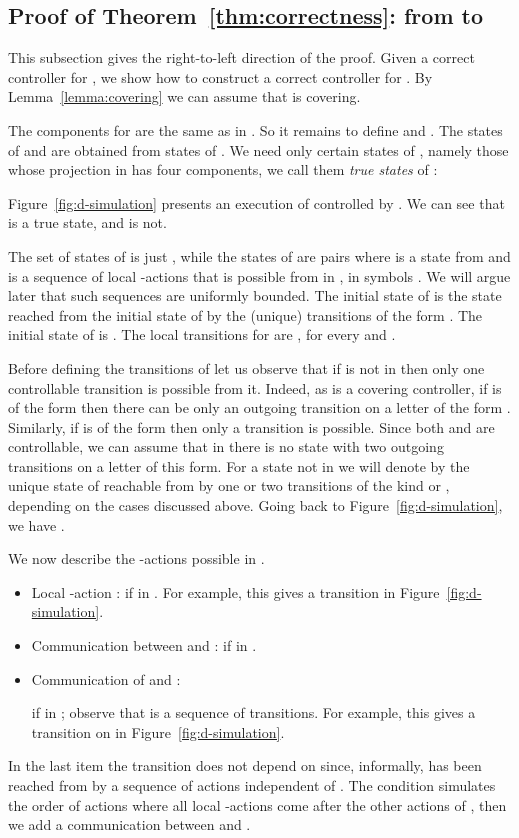 \documentclass[10pt,a4paper]{article}
\begin{document}
\subsection{Proof of Theorem~\ref{thm:correctness}: from 
                                to }\label{sec:D}
This subsection gives the
right-to-left direction of the proof. Given a correct controller  for
, we show how to construct a correct controller  for
. By Lemma~\ref{lemma:covering} we can assume that  is
covering.



The components  for  are the same as in
. So it remains to define
 and . 
The states of  and  are obtained from states of
. We need only certain states of ,
namely those  whose projection  in  has four
components, we call them \emph{true states} of :

Figure~\ref{fig:d-simulation}
presents an execution of  controlled by . We can see
that  is a true state, and  is not.

The set of states of  is just , while the states of
 are pairs  where  is a state from
 and  is a sequence of local
-actions  that is possible from  in , in
symbols . We will argue later that such sequences are
uniformly bounded. The
initial state of  is the state  reached from the initial state
of  by the (unique) transitions of the form
. The initial state of  is . 
The local transitions for  are 
, for every 
    and .


Before defining the transitions of  let us observe that if 
 is not in  then only one
controllable transition is possible from it. Indeed, as  is a
covering controller, if  is of the form  then
there can be only an outgoing transition on a letter of the form
. Similarly, if  is of the form 
then only a  transition is possible. Since both  and
 are controllable, we can assume that in  there is
no state with two outgoing transitions on a letter of this form. For a
state  not in  we will denote by
 the unique state of  reachable from 
by one or two transitions of the kind  or ,
depending on the cases discussed above. Going back to
Figure~\ref{fig:d-simulation}, we have . 

We now describe the -actions possible in .
\begin{itemize}
\item Local -action :  if
   in . For example, this gives a
  transition  in Figure~\ref{fig:d-simulation}.


\item Communication  between  and :  if  in .


\item Communication  of  and :
   
if  in ;
observe that  is a sequence of transitions. For example, this gives a
  transition on  in Figure~\ref{fig:d-simulation}.
\end{itemize}
In the last item the transition does not depend on  since,
informally,  has been reached from  by a sequence of
actions independent of . The condition  simulates the order of actions where all local -actions come
after the other actions of , then we add a communication between
 and .
\end{document}
